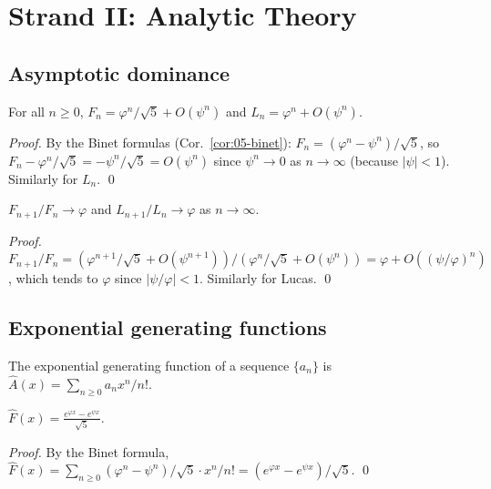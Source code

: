 \section{Strand II: Analytic Theory}
\label{sec:05-strand-ii}

\subsection{Asymptotic dominance}

\begin{theorem}
\label{thm:05-asymptotic}
For all $n \ge 0$, $F_n = \varphi^n/\sqrt{5} + O(\psi^n)$ and $L_n = \varphi^n + O(\psi^n)$.
\end{theorem}

\begin{proof}
By the Binet formulas (Cor.~\ref{cor:05-binet}):
$F_n = (\varphi^n - \psi^n)/\sqrt{5}$, so $F_n - \varphi^n/\sqrt{5} = -\psi^n/\sqrt{5} = O(\psi^n)$
since $\psi^n \to 0$ as $n \to \infty$ (because $|\psi| < 1$). Similarly
for $L_n$. \qed
\end{proof}

\begin{corollary}
\label{cor:05-asymptotic-rate}
$F_{n+1}/F_n \to \varphi$ and $L_{n+1}/L_n \to \varphi$ as $n \to \infty$.
\end{corollary}

\begin{proof}
$F_{n+1}/F_n = (\varphi^{n+1}/\sqrt{5} + O(\psi^{n+1}))/(\varphi^n/\sqrt{5} + O(\psi^n))
= \varphi + O((\psi/\varphi)^n)$, which tends to $\varphi$ since
$|\psi/\varphi| < 1$. Similarly for Lucas. \qed
\end{proof}

\subsection{Exponential generating functions}

\begin{definition}
\label{def:05-egf}
The exponential generating function of a sequence $\{a_n\}$ is
$\hat{A}(x) = \sum_{n \ge 0} a_n x^n / n!$.
\end{definition}

\begin{lemma}
\label{lem:05-fib-egf}
$\hat{F}(x) = \frac{e^{\varphi x} - e^{\psi x}}{\sqrt{5}}$.
\end{lemma}

\begin{proof}
By the Binet formula, $\hat{F}(x) = \sum_{n \ge 0} (\varphi^n - \psi^n)/\sqrt{5} \cdot x^n/n! =
(e^{\varphi x} - e^{\psi x})/\sqrt{5}$. \qed
\end{proof}

